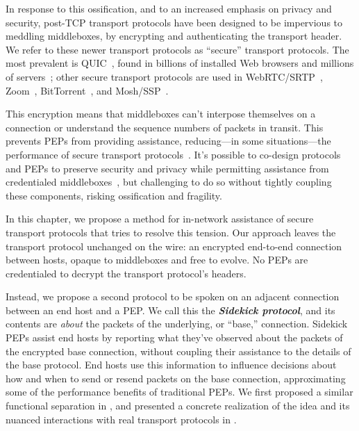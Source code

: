 In response to this ossification, and to an increased emphasis on privacy and
security, post-TCP transport protocols have been designed to be impervious to
meddling middleboxes, by encrypting and authenticating the transport header. We
refer to these newer transport protocols as ``secure'' transport protocols. The
most prevalent is QUIC~\cite{rfc9000}, found in billions of installed Web
browsers and millions of servers~\cite{zirngibl2021quicdeployment}; other secure
transport protocols are used in WebRTC/SRTP~\cite{rfc8834webrtc},
Zoom~\cite{zoom}, BitTorrent~\cite{bittorrent}, and
Mosh/SSP~\cite{winstein2012mosh}.

This encryption means that middleboxes can't interpose themselves on a
connection or understand the sequence numbers of packets in transit. This
prevents PEPs from providing assistance, reducing---in some situations---the
performance of secure transport protocols~\cite
{border2020quicsat-presentation,kuhn2021quic-over-sat,martin2022bbr-quic-sat,border2020evaluating,kosek2022quicpep}.
It's possible to co-design protocols and PEPs to preserve security and privacy
while permitting assistance from credentialed middleboxes~\cite
{ford2008logjam,sherry2015blindbox, dogar2012tapa,iyengar2009flow}, but
challenging to do so without tightly coupling these components, risking
ossification and fragility.

In this chapter, we propose a method for in-network assistance of secure transport
protocols that tries to resolve this tension. Our approach leaves the transport
protocol unchanged on the wire: an encrypted end-to-end connection between hosts,
opaque to middleboxes and free to evolve. No PEPs are credentialed to decrypt
the transport protocol's headers.

Instead, we propose a second protocol to be spoken on an adjacent connection
between an end host and a PEP. We call this the \emph{\bf Sidekick protocol},
and its contents are \emph{about} the packets of the underlying, or ``base,''
connection. Sidekick PEPs assist end hosts by reporting what they've observed
about the packets of the encrypted base connection, without coupling their
assistance to the details of the base protocol. End hosts use this information
to influence decisions about how and when to send or resend packets on the base
connection, approximating some of the performance benefits of traditional PEPs.
We first proposed a similar functional separation in \cite{yuan2022sidecar},
and presented a concrete realization of the idea and its nuanced
interactions with real transport protocols in \cite{yuan2024sidekick}.

